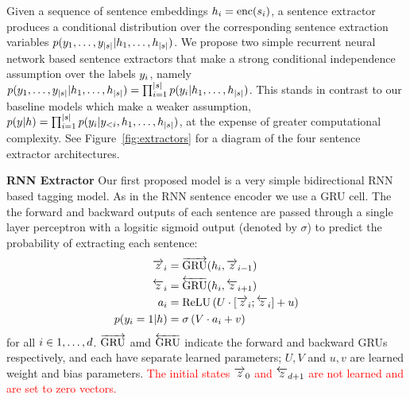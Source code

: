 Given a sequence of sentence embeddings $h_i = \operatorname{enc}(s_i)$,
a sentence extractor produces a conditional distribution over the 
corresponding sentence extraction variables 
$p(y_1,\ldots,y_{|s|}|h_1, \ldots, h_{|s|})$.
We propose two simple recurrent neural network based sentence extractors
that make a strong conditional independence assumption over the labels
$y_i$, namely
$p(y_1,\ldots,y_{|s|}| h_1, \ldots, h_{|s|})= \prod_{i=1}^{|s|}p(y_i| h_1, \ldots, h_{|s|})$. This stands in contrast to our 
baseline models which make a weaker assumption, 
$p(y|h) = \prod_{i=1}^{|s|} p(y_i|y_{<i}, h_1, \ldots, h_{|s|})$, at the expense of greater 
computational complexity. See Figure~\ref{fig:extractors} for a diagram of the 
four sentence extractor architectures.

\textbf{RNN Extractor} Our first proposed model is a very simple bidirectional
RNN based tagging model. As in the RNN sentence encoder we use a GRU cell.
The the forward and backward outputs of each sentence are passed through a 
single layer perceptron with a logsitic sigmoid output (denoted by $\sigma$)
to predict the probability
of extracting each sentence:
\begin{align}
    \overrightarrow{z}_i &= \overrightarrow{\operatorname{GRU}}(h_i, \overrightarrow{z}_{i-1}) \\
   \overleftarrow{z}_i &= \overleftarrow{\operatorname{GRU}}(h_i, \overleftarrow{z}_{i+1}) \\
   a_i &= \operatorname{ReLU}\left(U \cdot [\overrightarrow{z}_i; \overleftarrow{z}_i] + u \right)\\
   p(y_i=1|h) &= \sigma\left(V\cdot a_i + v  \right)
\end{align}
for all $i \in 1, \ldots, d$. $\overrightarrow{\operatorname{GRU}}$ amd $\overleftarrow{\operatorname{GRU}}$ indicate the 
forward and backward GRUs respectively, and each have separate learned 
parameters; $U, V$ and $u, v$ are learned weight and bias parameters.
\textcolor{red}{The initial states $\overrightarrow{z}_0$ and $\overleftarrow{z}_{d + 1}$ are not 
learned and are set to zero vectors.}



